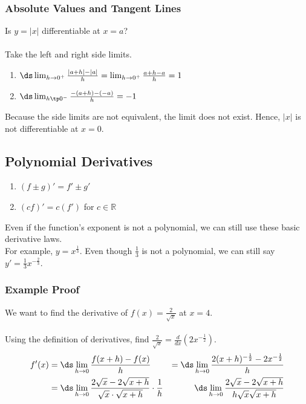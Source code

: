 \documentclass{article}
\begin{document}
\subsubsection{Absolute Values and Tangent Lines}
Is $y = |x|$ differentiable at $x = a$?\\\\
Take the left and right side limits.
\begin{enumerate}
    \item $\ds \lim_{h \to 0^+} \frac{|a + h| - |a|}{h} = \lim_{h \to 0^+} \frac{a + h - a}{h} = 1$
    \item $\ds \lim_{h \tp 0^-} \frac{-(a + h) - (-a)}{h} = -1$
\end{enumerate}
Because the side limits are not equivalent, the limit does not exist. Hence, $|x|$ is not differentiable at $x = 0$.

\subsection{Polynomial Derivatives}
\begin{enumerate}
    \item $(f \pm g)' = f' \pm g'$
    \item $(cf)' = c(f')$ for $c \in \mathbb{R}$
\end{enumerate}
Even if the function's exponent is not a polynomial, we can still use these basic derivative laws.\\
For example, $y = x^\frac{1}{3}$. Even though $\frac{1}{3}$ is not a polynomial, we can still say $y' = \frac{1}{3} x^{-\frac{2}{3}}$.
\subsubsection{Example Proof}
We want to find the derivative of $f(x) = \frac{2}{\sqrt{x}}$ at $x =4$.\\
\\
Using the definition of derivatives, find $\frac{2}{\sqrt{x}} = \frac{d}{dx}(2x^{-\frac{1}{2}})$.
\begin{align*}
    f'(x) & = \ds \lim_{h \to 0} \frac{f(x + h) - f(x)}{h} & = \ds \lim_{h \to 0} \frac{2(x+h)^{-\frac{1}{2}} - 2x^{-\frac{1}{2}}}{h}\\
    & = \ds \lim_{h \to 0} \frac{2 \sqrt{x} - 2 \sqrt{x + h}}{\sqrt{x} \cdot \sqrt{x+h}} \cdot \frac{1}{h} & 
    \ds \lim_{h \to 0} \frac{2\sqrt{x} - 2 \sqrt{x + h}}{h \sqrt{x} \sqrt{x + h}}
\end{align*}
\end{document}
